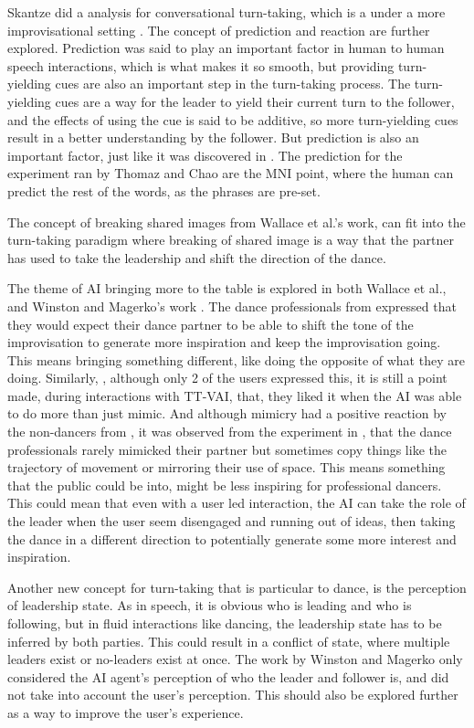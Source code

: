 \documentclass[final,5p,times,twocolumn,authoryear]{article}
\begin{document}
Skantze did a analysis for conversational turn-taking, which is a under
a more improvisational setting \cite{Skantze2021}. The concept of prediction and reaction
are further explored. Prediction was said to play an important factor in
human to human speech interactions, which is what makes it so smooth,
but providing turn-yielding cues are also an important step in the
turn-taking process. The turn-yielding cues are a way for the leader to
yield their current turn to the follower, and the effects of using the
cue is said to be additive, so more turn-yielding cues result in a
better understanding by the follower. But prediction is also an
important factor, just like it was discovered in \cite{Thomaz2011}. The
prediction for the experiment ran by Thomaz and Chao are the MNI point,
where the human can predict the rest of the words, as the phrases are
pre-set.

The concept of breaking shared images from Wallace et al.'s work, can
fit into the turn-taking paradigm where breaking of shared image is a
way that the partner has used to take the leadership and shift the
direction of the dance.

The theme of AI bringing more to the table is explored in both Wallace
et al., and Winston and Magerko's work \cite{Wallace2023Embody,
Winston2017}. The dance professionals from \cite{Wallace2023Embody}
expressed that they would expect their dance partner to be able to shift
the tone of the improvisation to generate more inspiration and keep the
improvisation going. This means bringing something different, like doing
the opposite of what they are doing. Similarly, \cite{Winston2017},
although only 2 of the users expressed this, it is still a point made,
during interactions with TT-VAI, that, they liked it when the AI was
able to do more than just mimic. And although mimicry
had a positive reaction by the non-dancers from \cite{Winston2017}, it
was observed from the experiment in \cite{Wallace2023Embody}, that the
dance professionals rarely mimicked their partner but sometimes copy
things like the trajectory of movement or mirroring their use of space.
This means something that the public could be into, might be less
inspiring for professional dancers. This could mean that even with a
user led interaction, the AI can take the role of the leader when the
user seem disengaged and running out of ideas, then taking the dance in
a different direction to potentially generate some more interest and inspiration.

Another new concept for turn-taking that is particular to dance, is the
perception of leadership state. As in speech, it is obvious who is
leading and who is following, but in fluid interactions like dancing,
the leadership state has to be inferred by both parties. This could
result in a conflict of state, where multiple leaders exist or
no-leaders exist at once. The work by Winston and Magerko only
considered the AI agent's perception of who the leader and follower is,
and did not take into account the user's perception. This should also be
explored further as a way to improve the user's experience.
\end{document}
